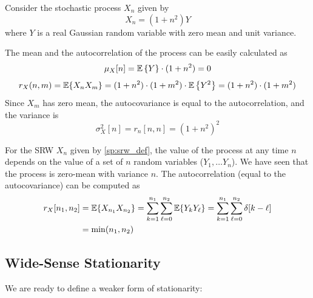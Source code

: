 \begin{example}
\label{Ex:SimpleProc}
Consider the stochastic process $X_n$ given by
\begin{equation}
X_n = (1 + n^2) Y 
\end{equation}
where $Y$ is a real Gaussian random variable with zero mean and unit variance. 

The mean and the autocorrelation of the process can be easily calculated as
\begin{equation}
\mu_X[n] = \mathbb{E}\left\{Y\right\} \cdot (1 + n^2) = 0
\end{equation}
\begin{equation}
r_X(n,m) = \mathbb{E}\{X_n X_m\}
         = (1 + n^2) \cdot (1 + m^2) \cdot \mathbb{E}\left\{Y^2\right\} 
         = (1 + n^2) \cdot (1 + m^2) 
\label{ec:autocorr2}
\end{equation}
Since $X_m$ has zero mean, the autocovariance is equal to the autocorrelation, and the variance is
\begin{equation}
\sigma_X^2[n] = r_n[n, n] = \left(1 + n^2\right)^2
\end{equation}

\end{example}

\begin{example}
\label{Ex:RandomWalk}

For the SRW $X_n$ given by \eqref{sp:srw_def}, the value of the process at any time $n$ depends on the value of a set of $n$ random variables ($Y_1,\ldots Y_n$). We have seen that the process is zero-mean with variance $n$. The autocorrelation (equal to the autocovariance) can be computed as
\begin{align}
r_X[n_1, n_2] 
	&= \mathbb{E}\{X_{n_1}X_{n_2}\}  
	 = \sum_{k=1}^{n_1} \sum_{\ell=0}^{n_2} \mathbb{E}\{Y_k Y_\ell\}  
	 = \sum_{k=1}^{n_1} \sum_{\ell=0}^{n_2} \delta[k - \ell]   \nonumber\\
	&= \min(n_1, n_2)
\label{eq:rx_srw}
\end{align}

\end{example}


\subsection{Wide-Sense Stationarity}
\label{sec:WSS}

We are ready to define a weaker form of stationarity:

